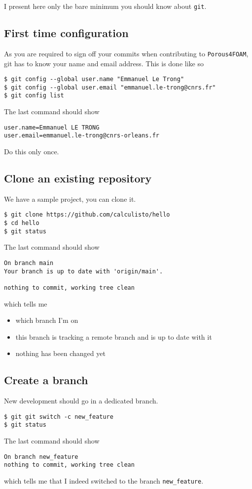 \documentclass[a4paper]{article}
\newcommand{\PF}{\texttt{Porous4FOAM}\xspace}
\newcommand{\GIT}{\texttt{git}\xspace}
\begin{document}
I present here only the bare minimum you should know about \GIT.

\subsection{First time configuration}
As you are required to sign off your commits when contributing to \PF, git has
to know your name and email address. This is done like so
\begin{verbatim}
$ git config --global user.name "Emmanuel Le Trong"
$ git config --global user.email "emmanuel.le-trong@cnrs.fr"
$ git config list
\end{verbatim}
The last command should show
\begin{verbatim}
user.name=Emmanuel LE TRONG
user.email=emmanuel.le-trong@cnrs-orleans.fr
\end{verbatim}
Do this only once. 

\subsection{Clone an existing repository}
We have a sample project, you can clone it.
\begin{verbatim}
$ git clone https://github.com/calculisto/hello
$ cd hello
$ git status
\end{verbatim}
The last command should show
\begin{verbatim}
On branch main
Your branch is up to date with 'origin/main'.

nothing to commit, working tree clean
\end{verbatim}
which tells me
\begin{itemize}
    \item which branch I'm on
    \item this branch is tracking a remote branch and is up to date with it
    \item nothing has been changed yet
\end{itemize}

\subsection{Create a branch}
New development should go in a dedicated branch.
\begin{verbatim}
$ git git switch -c new_feature
$ git status
\end{verbatim}
The last command should show
\begin{verbatim}
On branch new_feature
nothing to commit, working tree clean
\end{verbatim}
which tells me that I indeed switched to the branch \texttt{new\_feature}.
\end{document}
